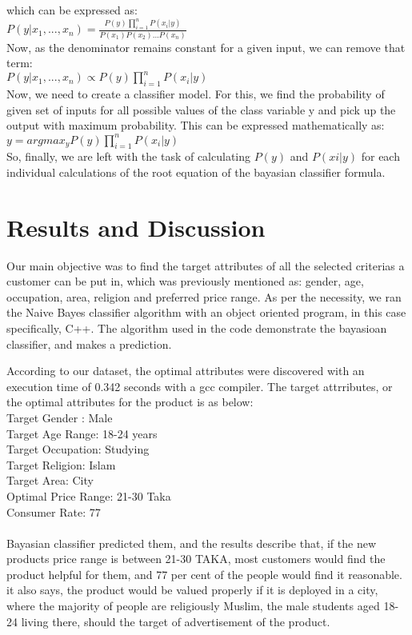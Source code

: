 \documentclass[conference]{IEEEtran}
\begin{document}
which can be expressed as:\\

$P(y|x_1,...,x_n) = \frac{P(y)\prod_{i=1}^{n}P(x_i|y)}{P(x_1)P(x_2)...P(x_n)}$\\

Now, as the denominator remains constant for a given input, we can remove that term:\\

$P(y|x_1,...,x_n)\propto P(y)\prod_{i=1}^{n}P(x_i|y)$\\

Now, we need to create a classifier model. For this, we find the probability of given set of inputs for all possible values of the class variable y and pick up the output with maximum probability. This can be expressed mathematically as:\\

$y = argmax_{y} P(y)\prod_{i=1}^{n}P(x_i|y)$\\


So, finally, we are left with the task of calculating $P(y)$ and $P(xi | y)$ for each individual calculations of the root equation of the bayasian classifier formula.

\section{Results and Discussion}

Our main objective was to find the target attributes of all the selected criterias a customer can be put in, which was previously mentioned as: gender, age, occupation, area, religion and preferred price range. As per the necessity, we ran the Naive Bayes classifier algorithm with an object oriented program, in this case specifically, C++. The algorithm used in the code demonstrate the bayasioan classifier, and makes a prediction. 

According to our dataset, the optimal attributes were discovered with an execution time of 0.342 seconds with a gcc compiler. The target attrributes, or the optimal attributes for the product is as below: \\ 

Target Gender : Male\\ 
Target Age Range: 18-24 years\\ 
Target Occupation: Studying\\ 
Target Religion: Islam\\ 
Target Area: City\\ 
Optimal Price Range: 21-30 Taka\\ 
Consumer Rate: 77
\\ 
\\ Bayasian classifier predicted them, and the results describe that, if the new products price range is between 21-30 TAKA, most customers would find the product helpful for them, and 77 per cent of the people would find it reasonable. it also says, the product would be valued properly if it is deployed in a city, where the majority of people are religiously Muslim, the male students aged 18-24 living there, should the target of advertisement of the product.  
\end{document}
